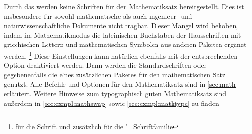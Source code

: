 Durch das \CD werden keine Schriften für den Mathematiksatz bereitgestellt. 
Dies ist insbesondere für sowohl mathematische als auch ingenieur- und 
naturwissenschaftliche Dokumente nicht tragbar. Dieser Mangel wird behoben, 
indem im Mathematikmodus die lateinischen Buchstaben der Hausschriften mit 
griechischen Lettern und mathematischen Symbolen aus anderen Paketen ergänzt 
werden.%
\footnote{%
   für die Schrift \DIN und zusätzlich  für 
  die \Univers"=Schriftfamilie%
}
Diese Einstellungen kann natürlich ebenfalls mit der entsprechenden Option 
deaktiviert werden. Dann werden die Standardschriften oder gegebenenfalls die 
eines zusätzlichen Paketes für den mathematischen Satz genutzt. Alle Befehle 
und Optionen für den Mathematiksatz sind in \autoref{sec:math} erläutert. 
Weitere Hinweise zum typographisch guten Mathematiksatz sind außerdem in 
\autoref{sec:exmpl:mathswap} sowie \autoref{sec:exmpl:mathtype} zu finden.


